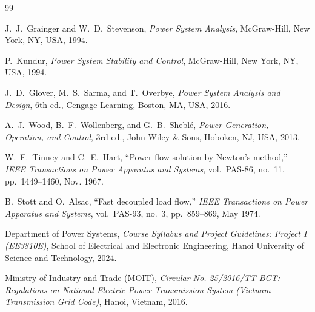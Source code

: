\documentclass[12pt,a4paper,oneside]{report}
\begin{document}
\begin{thebibliography}{99}

J.~J.~Grainger and W.~D.~Stevenson, \textit{Power System Analysis}, McGraw-Hill, New York, NY, USA, 1994.

P.~Kundur, \textit{Power System Stability and Control}, McGraw-Hill, New York, NY, USA, 1994.

J.~D.~Glover, M.~S.~Sarma, and T.~Overbye, \textit{Power System Analysis and Design}, 6th ed., Cengage Learning, Boston, MA, USA, 2016.

A.~J.~Wood, B.~F.~Wollenberg, and G.~B.~Sheblé, \textit{Power Generation, Operation, and Control}, 3rd ed., John Wiley \& Sons, Hoboken, NJ, USA, 2013.

W.~F.~Tinney and C.~E.~Hart, ``Power flow solution by Newton's method,'' \textit{IEEE Transactions on Power Apparatus and Systems}, vol.~PAS-86, no.~11, pp.~1449--1460, Nov. 1967.

B.~Stott and O.~Alsac, ``Fast decoupled load flow,'' \textit{IEEE Transactions on Power Apparatus and Systems}, vol.~PAS-93, no.~3, pp.~859--869, May 1974.

Department of Power Systems, \textit{Course Syllabus and Project Guidelines: Project I (EE3810E)}, School of Electrical and Electronic Engineering, Hanoi University of Science and Technology, 2024.

Ministry of Industry and Trade (MOIT), \textit{Circular No. 25/2016/TT-BCT: Regulations on National Electric Power Transmission System (Vietnam Transmission Grid Code)}, Hanoi, Vietnam, 2016.

\end{thebibliography}
\end{document}
